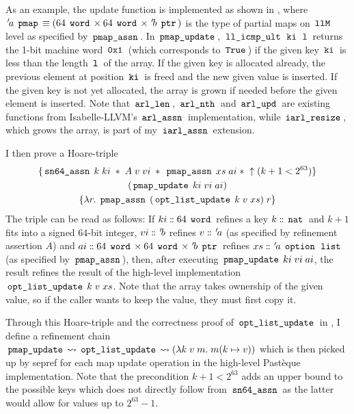 As an example, the update function is implemented as shown in , where ${\mskip2mu '\mskip-2mua} \; \,\text{\ttfamily pmap}\, \equiv (64 \; \,\text{\ttfamily word}\, \times 64 \; \,\text{\ttfamily word}\, \times {\mskip2mu '\mskip-2mub} \; \,\text{\ttfamily ptr}\,)$ is the type of partial maps on $\,\text{\ttfamily llM}\,$ level as specified by $\,\text{\ttfamily pmap\_assn}\,$.
In $\,\text{\ttfamily pmap\_update}\,$, $\,\text{\ttfamily ll\_icmp\_ult}\, \; \,\text{\ttfamily ki}\, \; \,\text{\ttfamily l}\,$ returns the 1-bit machine word $\,\text{\ttfamily 0x1}\,$ (which corresponds to $\,\text{\ttfamily True}\,$) if the given key $\,\text{\ttfamily ki}\,$ is less than the length $\,\text{\ttfamily l}\,$ of the array.
If the given key is allocated already, the previous element at position $\,\text{\ttfamily ki}\,$ is freed and the new given value is inserted.
If the given key is not yet allocated, the array is grown if needed before the given element is inserted.
Note that $\,\text{\ttfamily arl\_len}\,$, $\,\text{\ttfamily arl\_nth}\,$ and $\,\text{\ttfamily arl\_upd}\,$ are existing functions from Isabelle-LLVM's $\,\text{\ttfamily arl\_assn}\,$ implementation, while $\,\text{\ttfamily iarl\_resize}\,$, which grows the array, is part of my $\,\text{\ttfamily iarl\_assn}\,$ extension.

I then prove a Hoare-triple
\begin{gather*}
	\{\,\text{\ttfamily sn64\_assn}\, \; k \; ki \; \ast \; A \; v \; vi \; \ast \; \,\text{\ttfamily pmap\_assn}\, \; xs \; ai \; \ast \; \uparrow(k + 1 < 2^{63})\} \\
	(\,\text{\ttfamily pmap\_update}\, \; ki \; vi \; ai)\\
	\{\lambda r. \; \,\text{\ttfamily pmap\_assn}\, \; (\,\text{\ttfamily opt\_list\_update}\, \; k \; v \; xs) \; r\}
\end{gather*}
The triple can be read as follows:
If $ki \mathrel{\mathord{:}\mkern-1.2mu\mathord{:}} 64 \; \,\text{\ttfamily word}\,$ refines a key $k \mathrel{\mathord{:}\mkern-1.2mu\mathord{:}} \,\text{\ttfamily nat}\,$ and $k+1$ fits into a signed 64-bit integer, $vi \mathrel{\mathord{:}\mkern-1.2mu\mathord{:}} {\mskip2mu '\mskip-2mub}$ refines $v \mathrel{\mathord{:}\mkern-1.2mu\mathord{:}} {\mskip2mu '\mskip-2mua}$ (as specified by refinement assertion $A$) and $ai \mathrel{\mathord{:}\mkern-1.2mu\mathord{:}} 64 \; \,\text{\ttfamily word}\, \times 64 \; \,\text{\ttfamily word}\, \times {\mskip2mu '\mskip-2mub} \; \,\text{\ttfamily ptr}\,$ refines $xs \mathrel{\mathord{:}\mkern-1.2mu\mathord{:}} {\mskip2mu '\mskip-2mua} \; \,\text{\ttfamily option}\, \; \,\text{\ttfamily list}\,$ (as specified by $\,\text{\ttfamily pmap\_assn}\,$), then, after executing $\,\text{\ttfamily pmap\_update}\, \; ki \; vi \; ai$, the result refines the result of the high-level implementation $\,\text{\ttfamily opt\_list\_update}\, \; k \; v \; xs$.
Note that the array takes ownership of the given value, so if the caller wants to keep the value, they must first copy it.

Through this Hoare-triple and the correctness proof of $\,\text{\ttfamily opt\_list\_update}\,$ in , I define a refinement chain $\,\text{\ttfamily pmap\_update}\, \rightsquigarrow \,\text{\ttfamily opt\_list\_update}\, \rightsquigarrow (\lambda k \; v \; m. \; m(k\mapsto v))$ which is then picked up by sepref for each map update operation in the high-level Pastèque implementation.
Note that the precondition $k+1 < 2^{63}$ adds an upper bound to the possible keys which does not directly follow from $\,\text{\ttfamily sn64\_assn}\,$ as the latter would allow for values up to $2^{63}-1$.

